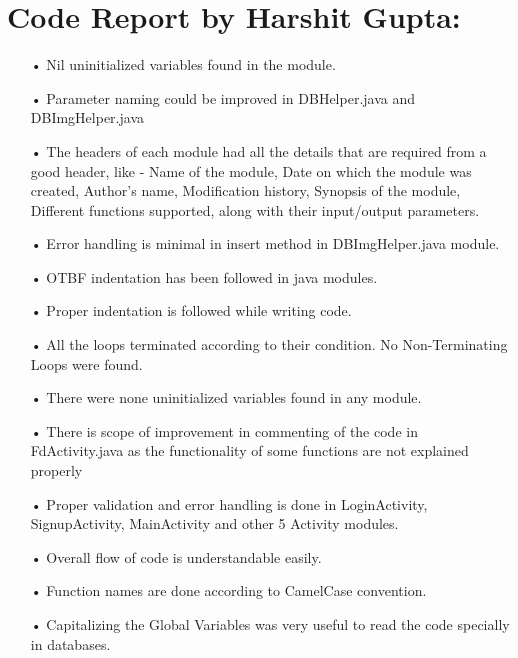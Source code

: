 \documentclass{scrreprt}
\begin{document}
\section{Code Report by Harshit Gupta:}
\begin{itemize}
\item[•] Nil uninitialized variables found in the module.
\item[•] Parameter naming could be improved in DBHelper.java and DBImgHelper.java
\item[•] The headers of each module had all the details that are required from a good
header, like - Name of the module, Date on which the module was created, Author’s
name, Modification history, Synopsis of the module, Different functions supported,
along with their input/output parameters.
\item[•] Error handling is minimal in insert method in DBImgHelper.java module.
\item[•] OTBF indentation has been followed in java modules.
\item[•] Proper indentation is followed while writing code.
\item[•] All the loops terminated according to their condition. No Non-Terminating Loops
were found.
\item[•] There were none uninitialized variables found in any module.
\item[•] There is scope of improvement in commenting of the code in FdActivity.java as the functionality of
some functions are not explained properly
\item[•] Proper validation and error handling is done in LoginActivity, SignupActivity, MainActivity and other 5 Activity modules.
\item[•] Overall flow of code is understandable easily.
\item[•] Function names are done according to CamelCase convention.
\item[•] Capitalizing the Global Variables was very useful to read the code specially in databases.
\end{itemize}
\newpage
\end{document}
